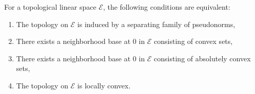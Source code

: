 For a topological linear space $\mathcal{E}$, the following conditions are equivalent:
\begin{enumerate}
\item[(i)] The topology on $\mathcal{E}$ is induced by a separating family of pseudonorms,
\item[(ii)] There exists a neighborhood base at $0$ in $\mathcal{E}$ consisting of convex sets,
\item[(iii)] There exists a neighborhood base at $0$ in $\mathcal{E}$ consisting of absolutely convex sets,
\item[(iv)] The topology on $\mathcal{E}$ is locally convex.
\end{enumerate}
